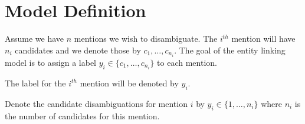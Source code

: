 \section{Model Definition}
Assume we have $n$ mentions we wish to disambiguate. The $i^{th}$ mention will have $n_i$ candidates and we denote those by $c_1,\ldots, c_{n_i}$. The goal 
of the entity linking model is to assign a label $y_i\in \{c_1,\ldots, c_{n_i}\}$ to each mention.



The label for the $i^{th}$ mention will be denoted by $y_i$. 


Denote the candidate
disambiguations for mention $i$ by $y_i \in \{1,\ldots, n_i\}$ where $n_i$ is the number of candidates for this mention. 



